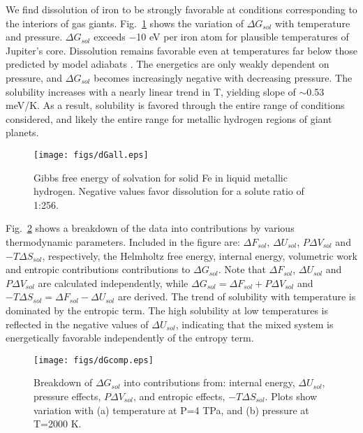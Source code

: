 We find dissolution of iron to be strongly favorable at conditions corresponding to
the interiors of gas giants. Fig.~\ref{fig:dGall}  shows the variation of $\Delta G_{sol}$
with temperature and pressure. $\Delta G_{sol}$ exceeds $-$10 eV per iron atom for
plausible temperatures of Jupiter's core. Dissolution remains favorable even
at temperatures far below those predicted by model adiabats
\citep{militzer2013a,militzer2013b}. The energetics
are only weakly dependent on pressure, and  $\Delta G_{sol}$ becomes increasingly
negative with decreasing pressure. The solubility increases with a nearly
linear trend in T, 
yielding slope of $\sim$0.53 meV/K. As a result, solubility is favored
through the entire range of conditions considered, and likely the entire range
for metallic hydrogen regions of giant planets.

 \begin{figure}[!h] %
   \centering
   \texttt{[image: figs/dGall.eps]} 
\caption{Gibbs free energy of solvation for solid Fe in liquid metallic
    hydrogen. Negative values favor dissolution for a solute ratio of 1:256. \label{fig:dGall}}
\end{figure}

Fig.~\ref{fig:dGcomp} shows a breakdown of the data into contributions by various
thermodynamic parameters. Included in the figure are: $\Delta F_{sol}$, $\Delta U_{sol}$,
$P\Delta V_{sol}$ and $-T\Delta S_{sol}$, respectively, the Helmholtz free energy, internal
energy, volumetric work and entropic contributions contributions to $\Delta
G_{sol}$. Note that $\Delta F_{sol}$, $\Delta U_{sol}$ and $P\Delta V_{sol}$
are calculated independently, while $\Delta G_{sol}=\Delta F_{sol}+P\Delta
V_{sol}$ and $-T\Delta S_{sol}=\Delta F_{sol}-\Delta U_{sol}$ are derived. 
The trend of solubility with temperature is dominated by the entropic term.
The high solubility at low temperatures is
reflected in the negative values of $\Delta U_{sol}$, indicating that the
mixed system is energetically favorable independently of the entropy term. 

 \begin{figure}[!h] %
   \centering
   \texttt{[image: figs/dGcomp.eps]} 
\caption{Breakdown of $\Delta G_{sol}$ into contributions from: internal
energy,
$\Delta U_{sol}$, pressure effects, $P\Delta V_{sol}$, and entropic effects,
$-T\Delta S_{sol}$. Plots show variation with (a) temperature at P=4 TPa, and
(b) pressure at T=2000 K. \label{fig:dGcomp}}
\end{figure}

